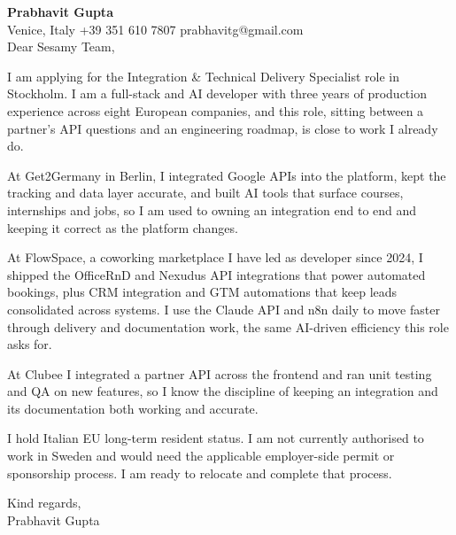 \documentclass[a4paper,10.5pt]{article}
\begin{document}
\textbf{Prabhavit Gupta}\\
Venice, Italy \textbar{} +39 351 610 7807 \textbar{} prabhavitg@gmail.com\\[10pt]
Dear Sesamy Team,

I am applying for the Integration \& Technical Delivery Specialist role in Stockholm. I am a full-stack and AI developer with three years of production experience across eight European companies, and this role, sitting between a partner's API questions and an engineering roadmap, is close to work I already do.

At Get2Germany in Berlin, I integrated Google APIs into the platform, kept the tracking and data layer accurate, and built AI tools that surface courses, internships and jobs, so I am used to owning an integration end to end and keeping it correct as the platform changes.

At FlowSpace, a coworking marketplace I have led as developer since 2024, I shipped the OfficeRnD and Nexudus API integrations that power automated bookings, plus CRM integration and GTM automations that keep leads consolidated across systems. I use the Claude API and n8n daily to move faster through delivery and documentation work, the same AI-driven efficiency this role asks for.

At Clubee I integrated a partner API across the frontend and ran unit testing and QA on new features, so I know the discipline of keeping an integration and its documentation both working and accurate.

I hold Italian EU long-term resident status. I am not currently authorised to work in Sweden and would need the applicable employer-side permit or sponsorship process. I am ready to relocate and complete that process.

Kind regards,\\
Prabhavit Gupta
\end{document}
